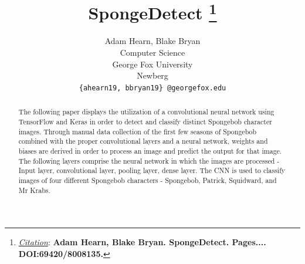 \documentclass{article}
\title{SpongeDetect
\thanks{\textit{\underline{Citation}}: 
\textbf{Adam Hearn, Blake Bryan. SpongeDetect. Pages.... DOI:69420/8008135.}} 
}
\author{
  Adam Hearn, Blake Bryan \\
  Computer Science \\
  George Fox University \\
  Newberg\\
  \texttt{\{ahearn19, bbryan19\} @georgefox.edu} \\
}
\begin{document}
\maketitle


\begin{abstract}
{The following paper displays the utilization of a convolutional neural network using TensorFlow and Keras in order to detect and classify distinct Spongebob character images. Through manual data collection of the first few seasons of Spongebob combined with the proper convolutional layers and a neural network, weights and biases are derived in order to process an image and predict the output for that image. The following layers comprise the neural network in which the images are processed - Input layer, convolutional layer, pooling layer, dense layer. The CNN is used to classify images of four different Spongebob characters - Spongebob, Patrick, Squidward, and Mr Krabs.}
\end{abstract}
\vskip 0.3in
\end{document}
